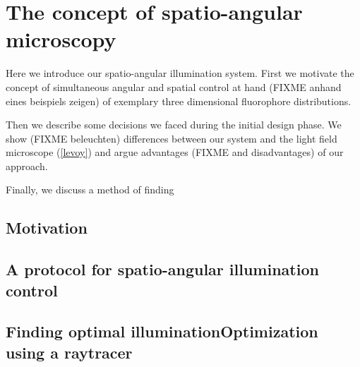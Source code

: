 \chapter{The concept of spatio-angular microscopy}
\label{sec:concept}
\begin{summary}
  Here we introduce our spatio-angular illumination system. First we
  motivate the concept of simultaneous angular and spatial control at
  hand (FIXME anhand eines beispiels zeigen) of exemplary three
  dimensional fluorophore distributions.  

  Then we describe some decisions we faced during the initial design
  phase. We show (FIXME beleuchten) differences between our system and
  the light field microscope (\ref{levoy}) and argue advantages (FIXME
  and disadvantages) of our approach.

  Finally, we discuss a method of finding

\end{summary}
\section{Motivation}
\section{A protocol for spatio-angular illumination control}
\section{Finding optimal illuminationOptimization using a raytracer}
